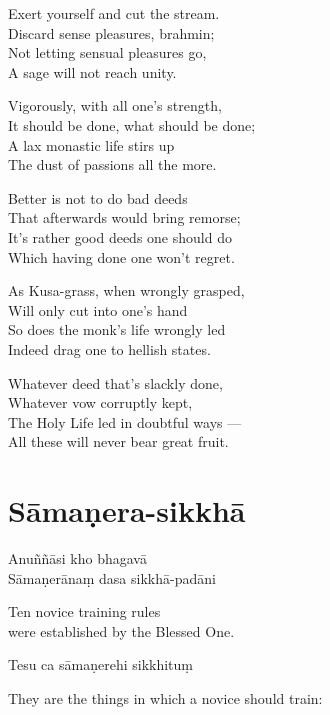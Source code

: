 \begin{paritta}
Exert yourself and cut the stream.\\
Discard sense pleasures, brahmin;\\
Not letting sensual pleasures go,\\
A sage will not reach unity.

Vigorously, with all one's strength,\\
It should be done, what should be done;\\
A lax monastic life stirs up\\
The dust of passions all the more.

Better is not to do bad deeds\\
That afterwards would bring remorse;\\
It's rather good deeds one should do\\
Which having done one won't regret.

As Kusa-grass, when wrongly grasped,\\
Will only cut into one's hand\\
So does the monk's life wrongly led\\
Indeed drag one to hellish states.

Whatever deed that's slackly done,\\
Whatever vow corruptly kept,\\
The Holy Life led in doubtful ways ---\\
All these will never bear great fruit.
\end{paritta}

\section{Sāmaṇera-sikkhā}


Anuññāsi kho bhagavā\\
Sāmaṇerānaṃ dasa sikkhā-padāni

\begin{english}
  Ten novice training rules\\
  were established by the Blessed One.
\end{english}

Tesu ca sāmaṇerehi sikkhituṃ

\begin{english}
  They are the things in which a novice should train:
\end{english}

